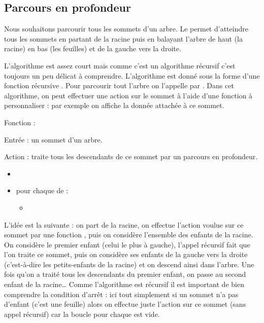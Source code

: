 \documentclass[11pt,class=report,crop=false]{standalone}
\begin{document}
	

\subsection{Parcours en profondeur}


Nous souhaitons parcourir tous les sommets d'un arbre. Le  permet d'atteindre tous les sommets en partant de la racine puis en balayant l'arbre de haut (la racine) en bas (les feuilles) et de la gauche vers la droite.


L'algorithme est assez court mais comme c'est un algorithme récursif c'est toujours un peu délicat à comprendre.
L'algorithme est donné sous la forme d'une fonction récursive . Pour parcourir tout l'arbre on l'appelle par 
. Dans cet algorithme, on peut effectuer une action sur le sommet à l'aide d'une fonction  à personnaliser : par exemple on affiche la donnée attachée à ce sommet.


\begin{algorithme}
	Fonction : 	
	
	Entrée : un sommet d'un arbre.
	
	Action : traite tous les descendants de ce sommet par un parcours en profondeur.
	
	\begin{itemize}
		\item {}
        \item pour chaque  de :
        \begin{itemize}			
	       \item {}
        \end{itemize}		
	\end{itemize}  
\end{algorithme}

L'idée est la suivante : on part de la racine, on effectue l'action voulue sur ce sommet par une fonction , puis on considère l'ensemble des enfants de la racine. On considère le premier enfant (celui le plus à gauche), l'appel récursif fait que l'on traite ce sommet, puis on considère ses enfants de la gauche vers la droite (c'est-à-dire les petits-enfants de la racine) et on descend ainsi dans l'arbre. Une fois qu'on a traité tous les descendants du premier enfant, on passe au second enfant de la racine\ldots{}
Comme l'algorithme est récursif il est important de bien comprendre la condition d'arrêt : ici tout simplement si un sommet n'a pas d'enfant (c'est une feuille) alors on effectue juste l'action sur ce sommet (sans appel récursif) car la boucle \og{}pour chaque \fg{} est vide.
\end{document}
